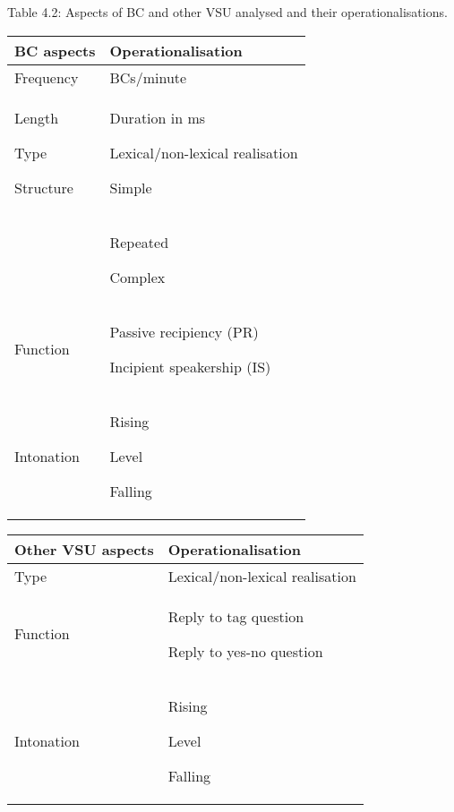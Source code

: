 \begin{stylelsTableHeading}
Table 4.2: Aspects of BC and other VSU analysed and their operationalisations.
\end{stylelsTableHeading}

\begin{flushleft}
\tablefirsthead{}
\tablehead{}
\tabletail{}
\tablelasttail{}
\begin{supertabular}{m{1.6156598in}m{1.9670599in}}
\hline
BC aspects &
Operationalisation\\\hline
Frequency &
BCs/minute \\
Length

Type

Structure &
Duration in ms

Lexical/non-lexical realisation 

Simple\\
 &
Repeated

Complex\\
Function &
Passive recipiency (PR)

Incipient speakership (IS)\\
Intonation &
Rising

Level

Falling\\\hline
\end{supertabular}
\end{flushleft}
\begin{styleStandard}\bfseries

\end{styleStandard}

\begin{center}
\begin{minipage}{3.6425in}
\begin{flushleft}
\tablefirsthead{}
\tablehead{}
\tabletail{}
\tablelasttail{}
\begin{supertabular}{m{1.3976599in}m{2.0865598in}}
\hline
Other VSU aspects &
Operationalisation\\\hline
Type &
Lexical/non-lexical realisation \\
Function &
Reply to tag question 

Reply to yes-no question\\
Intonation &
Rising

Level

Falling\\\hline
\end{supertabular}
\end{flushleft}
\end{minipage}
\end{center}
